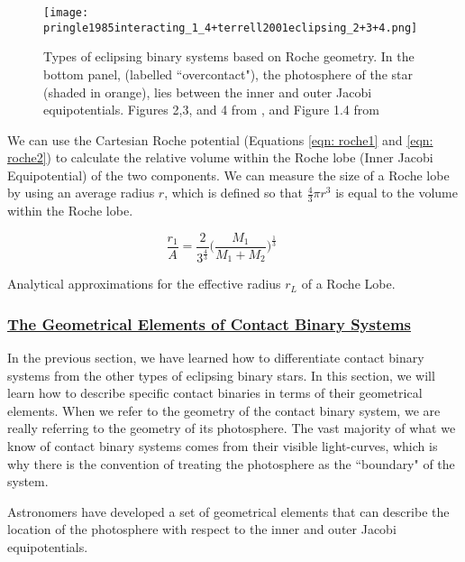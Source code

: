 \documentclass[12pt]{article} %
\numberwithin{equation}{section} %
\begin{document}
\begin{figure}[H]
\centering
\texttt{[image: pringle1985interacting\_1\_4+terrell2001eclipsing\_2+3+4.png]}
\caption{Types of eclipsing binary systems based on Roche geometry. In the bottom panel, (labelled ``overcontact"), the photosphere of the star (shaded in orange), lies between the inner and outer Jacobi equipotentials. Figures 2,3, and 4 from \citet{terrell2001eclipsing}, and Figure 1.4 from \citet{pringle1985interacting}}
\label{fig: pringle1985interacting_1_4+terrell2001eclipsing_2+3+4}
\end{figure}

We can use the Cartesian Roche potential (Equations \ref{eqn: roche1} and \ref{eqn: roche2}) to calculate the relative volume within the Roche lobe (Inner Jacobi Equipotential) of the two components. We can measure the size of a Roche lobe by using an average radius $r$, which is defined so that $\frac{4}{3} \pi r^{3}$ is equal to the volume within the Roche lobe.

\citet{paczynski1971evolutionary}

\begin{equation} \label{paczynski1971evolutionary_4}
\frac{r_{1}}{A} = \frac{2}{3^{\frac{4}{3}}} \Big( \frac{M_{1}}{M_{1} + M_{2}} \Big)^{\frac{1}{3}} \qquad 
\end{equation}

Analytical approximations for the effective radius $r_{L}$ of a Roche Lobe. \citet{eggleton1983approximation}

\subsubsection[The Geometrical Elements of Contact Binary Systems]{\hyperlink{toc}{The Geometrical Elements of Contact Binary Systems}} \label{sec: The Geometrical Elements of Contact Binary Systems}

In the previous section, we have learned how to differentiate contact binary systems from the other types of eclipsing binary stars. In this section, we will learn how to describe specific contact binaries in terms of their geometrical elements. When we refer to the geometry of the contact binary system, we are really referring to the geometry of its photosphere. The vast majority of what we know of contact binary systems comes from their visible light-curves, which is why there is the convention of treating the photosphere as the ``boundary" of the system.

Astronomers have developed a set of geometrical elements that can describe the location of the photosphere with respect to the inner and outer Jacobi equipotentials. 
\end{document}
